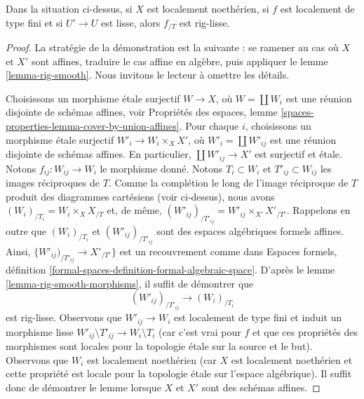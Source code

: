 \begin{lemma}
\label{lemma-smooth-gives-rig-smooth}
Dans la situation ci-dessus, si $X$ est localement noethérien,
si $f$ est localement de type fini et si $U' \to U$ est lisse, alors
$f_{/T}$ est rig-lisse.
\end{lemma}

\begin{proof}
La stratégie de la démonstration est la suivante : se ramener au cas où $X$ et
$X'$ sont affines, traduire le cas affine en algèbre, puis appliquer le
lemme \ref{lemma-rig-smooth}. Nous invitons le lecteur à omettre les détails.

\medskip\noindent
Choisissons un morphisme étale surjectif $W \to X$, où $W = \coprod W_i$
est une réunion disjointe de schémas affines, voir Propriétés des espaces, lemme
\ref{spaces-properties-lemma-cover-by-union-affines}.
Pour chaque $i$, choisissons un morphisme étale surjectif
$W'_i \to W_i \times_X X'$, où $W'_i = \coprod W'_{ij}$ est une réunion
disjointe de schémas affines. En particulier,
$\coprod W'_{ij} \to X'$ est surjectif et étale.
Notons $f_{ij} : W_{ij} \to W_i$ le morphisme donné.
Notons $T_i \subset W_i$ et $T'_{ij} \subset W_{ij}$ les images
réciproques de $T$. Comme la complétion le long de l'image réciproque de
$T$ produit des diagrammes cartésiens (voir ci-dessus), nous avons
$(W_i)_{/T_i} = W_i \times_X X_{/T}$ et, de même,
$(W'_{ij})_{/T'_{ij}} = W'_{ij} \times_{X'} X'_{/T'}$.
Rappelons en outre que $(W_i)_{/T_i}$ et $(W'_{ij})_{/T'_{ij}}$
sont des espaces algébriques formels affines.
Ainsi, $\{W'_{ij})_{/T'_{ij}} \to X'_{/T'}\}$ est un recouvrement
comme dans Espaces formels, définition
\ref{formal-spaces-definition-formal-algebraic-space}.
D'après le lemme \ref{lemma-rig-smooth-morphisms},
il suffit de démontrer que
$$
(W'_{ij})_{/T'_{ij}} \longrightarrow (W_i)_{/T_i}
$$
est rig-lisse. Observons que $W'_{ij} \to W_i$
est localement de type fini et induit un morphisme lisse
$W'_{ij} \setminus T'_{ij} \to W_i \setminus T_i$
(car c'est vrai pour $f$ et que ces propriétés des morphismes sont
locales pour la topologie étale sur la source et le but).
Observons que $W_i$ est localement noethérien (car $X$ est localement
noethérien et cette propriété est locale pour la topologie étale sur
l'espace algébrique). Il suffit donc de démontrer le lemme lorsque
$X$ et $X'$ sont des schémas affines.


\end{proof}
